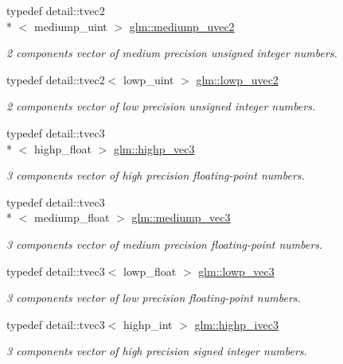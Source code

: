 \begin{DoxyCompactItemize}
typedef detail\-::tvec2\\*
$<$ mediump\-\_\-uint $>$ \hyperlink{group__core__precision_ga95f22fddbbb9561e648aaa2a461be59c}{glm\-::mediump\-\_\-uvec2}
\begin{DoxyCompactList}\small\item\em 2 components vector of medium precision unsigned integer numbers. \end{DoxyCompactList}\item 
typedef detail\-::tvec2$<$ lowp\-\_\-uint $>$ \hyperlink{group__core__precision_gacae56e02818d0da34e70ac934807388c}{glm\-::lowp\-\_\-uvec2}
\begin{DoxyCompactList}\small\item\em 2 components vector of low precision unsigned integer numbers. \end{DoxyCompactList}\item 
typedef detail\-::tvec3\\*
$<$ highp\-\_\-float $>$ \hyperlink{group__core__precision_gab660f8916a9c4a72bf71cd4279ae19fb}{glm\-::highp\-\_\-vec3}
\begin{DoxyCompactList}\small\item\em 3 components vector of high precision floating-\/point numbers. \end{DoxyCompactList}\item 
typedef detail\-::tvec3\\*
$<$ mediump\-\_\-float $>$ \hyperlink{group__core__precision_gafab50a7800793f88befe5d2a0120c65b}{glm\-::mediump\-\_\-vec3}
\begin{DoxyCompactList}\small\item\em 3 components vector of medium precision floating-\/point numbers. \end{DoxyCompactList}\item 
typedef detail\-::tvec3$<$ lowp\-\_\-float $>$ \hyperlink{group__core__precision_gaacc50c233ef2759c852eb90be78bc5fc}{glm\-::lowp\-\_\-vec3}
\begin{DoxyCompactList}\small\item\em 3 components vector of low precision floating-\/point numbers. \end{DoxyCompactList}\item 
typedef detail\-::tvec3$<$ highp\-\_\-int $>$ \hyperlink{group__core__precision_ga8d03a7d21f89a6541a278bf78bb6b1fa}{glm\-::highp\-\_\-ivec3}
\begin{DoxyCompactList}\small\item\em 3 components vector of high precision signed integer numbers. \end{DoxyCompactList}\item 

\end{DoxyCompactItemize}
